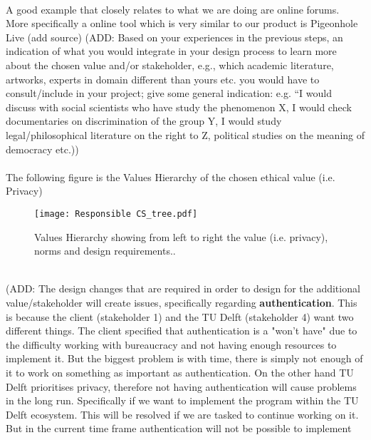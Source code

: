 \documentclass{article}
\begin{document}
\\A good example that closely relates to what we are doing are online forums. More specifically a online tool which is very similar to our product is Pigeonhole Live (add source)  (ADD: Based on your experiences in the previous steps, an indication of what you would integrate in your design process to learn more about the chosen value and/or stakeholder, e.g., which academic literature, artworks, experts in domain different than yours etc. you would have to consult/include in your project; give some general indication: e.g. “I would discuss with social scientists who have study the phenomenon X, I would check documentaries on discrimination of the group Y, I would study legal/philosophical literature on the right to Z, political studies on the meaning of democracy etc.))\\

\\The following figure is the Values Hierarchy of the chosen ethical value (i.e. Privacy) \\

\begin{figure}[h]
    \centering
    \texttt{[image: Responsible CS\_tree.pdf]}
    \caption{Values Hierarchy showing from left to right the value (i.e. privacy), norms and design requirements..}
    \label{fig:tree}
\end{figure}


\\(ADD: The design changes that are required in order to design for the additional value/stakeholder will create issues, specifically regarding \textbf{authentication}. This is because the client (stakeholder 1) and the TU Delft (stakeholder 4) want two different things. The client specified that authentication is a "won't have" due to the difficulty working with bureaucracy and not having enough resources to implement it. But the biggest problem is with time, there is simply not enough of it to work on something as important as authentication. On the other hand TU Delft prioritises privacy, therefore not having authentication will cause problems in the long run. Specifically if we want to implement the program within the TU Delft ecosystem.  This will be resolved if we are tasked to continue working on it. But in the current time frame authentication will not be possible to implement \\
\end{document}
